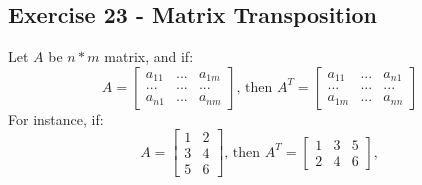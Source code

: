 \documentclass[12pt]{article}
\begin{document}
\subsection*{Exercise 23 - Matrix Transposition}
Let $A$ be $n*m$ matrix, and if:
\[
  A = \begin{bmatrix} 
        a_{11} & ... & a_{1m} \\ 
        ... & ... & ... \\
        a_{n1} & ... & a_{nm} 
      \end{bmatrix}
  \text{, then }
  A^{T} = \begin{bmatrix} 
            a_{11} & ... & a_{n1} \\ 
            ... & ... & ... \\
            a_{1m} & ... & a_{nn} 
          \end{bmatrix}
\]
\noindent For instance, if:
\[
  A = \begin{bmatrix} 
        1 & 2 \\
        3 & 4 \\ 
        5 & 6
      \end{bmatrix}
  \text{, then }
  A^{T} = \begin{bmatrix} 
            1 & 3 & 5 \\ 
            2 & 4 & 6
          \end{bmatrix},
\]
\end{document}
